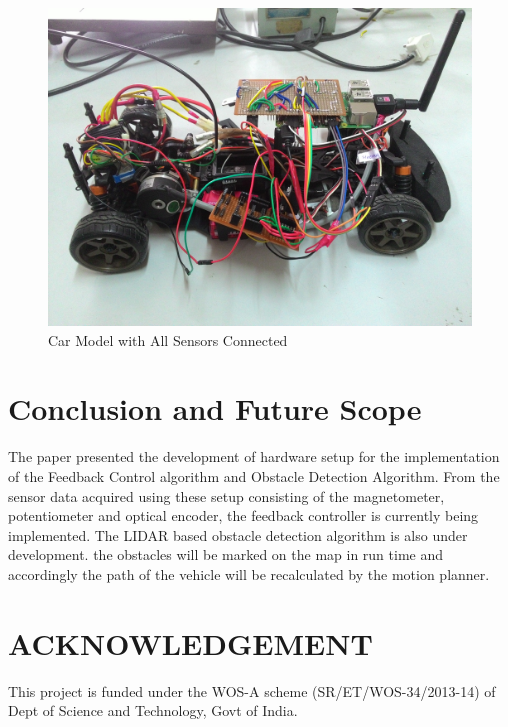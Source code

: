 \documentclass[conference]{IEEEtran}
\begin{document}
\begin{figure}[H]
\centering
\includegraphics[width=0.8\linewidth]{car1}
\caption{Car Model with All Sensors Connected}
\end{figure}



\ifCLASSOPTIONcaptionsoff
\fi

\section{ Conclusion and Future Scope}
 

The paper presented the development of hardware setup for the implementation of the Feedback Control algorithm and Obstacle Detection Algorithm. From the sensor data acquired using these setup consisting of the magnetometer, potentiometer and optical encoder, the feedback controller is currently being implemented. The LIDAR based obstacle detection algorithm is also under development. the obstacles will be marked on the map in run time and accordingly the path of the vehicle will be recalculated by the motion planner. 

\section{ ACKNOWLEDGEMENT} 

This project is funded under the WOS-A scheme (SR/ET/WOS-34/2013-14) of Dept of Science and Technology, Govt of India.

\end{document}
